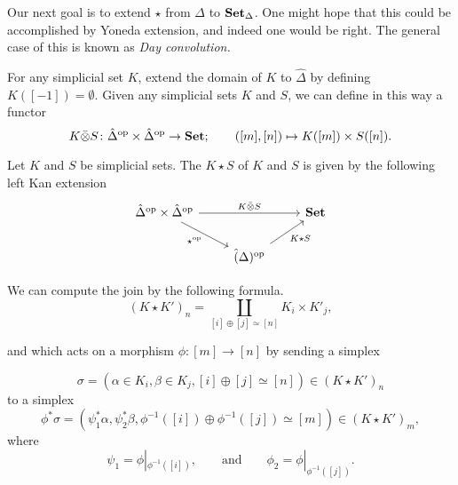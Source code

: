 \documentclass[main.tex]{subfiles}
\begin{document}
Our next goal is to extend $\star$ from $\Delta$ to $\operatorname{\mathbf{Set}_{\Delta}}$. One might hope that this could be accomplished by Yoneda extension, and indeed one would be right. The general case of this is known as \emph{Day convolution.}

For any simplicial set $K$, extend the domain of $K$ to $\hat{\Delta}$ by defining $K([-1]) = \emptyset$. Given any simplicial sets $K$ and $S$, we can define in this way a functor
\begin{equation*}
  K \bar{\otimes} S\colon \hat{\Delta}^{\mathrm{op}} \times \hat{\Delta}^{\mathrm{op}} \to \mathbf{Set};\qquad ([m], [n]) \mapsto K([m]) \times S([n]).
\end{equation*}

\begin{definition}
  \label{def:join_of_simplicial_sets}
  Let $K$ and $S$ be simplicial sets. The  $K \star S$ of $K$ and $S$ is given by the following left Kan extension
  \begin{equation*}
    \begin{tikzcd}
      \hat{\Delta}\op \times \hat{\Delta}\op
      \arrow[rr, "K \bar{\otimes} S"]
      \arrow[dr, swap, "\star\op"]
      && \Set
      \\
      & \hat(\Delta)\op
      \arrow[ur, swap, "K \star S"]
    \end{tikzcd}
  \end{equation*}
\end{definition}

\begin{theorem}
  We can compute the join by the following formula.
  \begin{equation*}
    (K \star K')_{n} = \coprod_{[i] \oplus [j] \simeq [n]} K_{i} \times K'_{j},
  \end{equation*}
\end{theorem}

and which acts on a morphism $\phi\colon [m] \to [n]$ by sending a simplex

\begin{equation*}
  \sigma = (\alpha \in K_{i}, \beta \in K_{j}, [i] \oplus [j] \simeq [n]) \in (K \star K')_{n}
\end{equation*}
to a simplex
\begin{equation*}
  \phi^{*}\sigma = (\psi^{*}_{1} \alpha, \psi^{*}_{2} \beta, \phi^{-1}([i]) \oplus \phi^{-1}([j]) \simeq [m]) \in (K \star K')_{m},
\end{equation*}
where
\begin{equation*}
  \psi_{1} = \phi|_{\phi^{-1}([i])},\qquad\text{and}\qquad \phi_{2} = \phi|_{\phi^{-1}([j])}.
\end{equation*}
\end{document}
